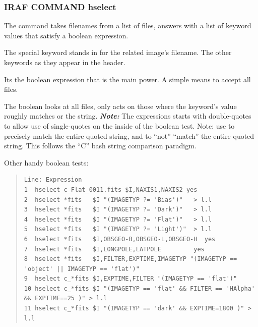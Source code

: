 \documentclass[letter,11pt,oneside]{article}
\begin{document}
\subsubsection{IRAF COMMAND hselect}

The {\color{verbcolor}{\verb#hselect#}} command takes filenames from
a list of files, answers with a list of keyword values that satisfy a
boolean expression.

\begin{quote}
{\color{verbcolor}{\verb#hselect filelist Comma-Keyword-List boolean#}}
\end{quote}

The special keyword {\color{verbcolor}{\verb#$I#}} stands in for the
related image's filename. The other keywords as they appear in the header.

Its the boolean expression that is the main power. A simple
{\color{verbcolor}{\verb#yes#}} means to accept all files.

The boolean {\color{verbcolor}{\verb#"(IMAGETYP ?= 'Bias')"#}} looks
at all files, only acts on those where the {\color{verbcolor}{\verb#IMAGETYP#}}
keyword's value roughly matches or {\color{verbcolor}{\verb#looks like (?=)#}}
the string. \textbf{\emph{Note:}} The expressions starts with double-quotes to allow
use of single-quotes on the inside of the boolean test. Note: use {\color{verbcolor}{\verb#==#}}
to precisely match the entire quoted string, and {\color{verbcolor}{\verb#!=#}} to
``not'' ``match'' the entire quoted string. This follows the ``C'' bash string comparison
paradigm.

Other handy boolean tests:

\begin{quote}
\begingroup \fontsize{10pt}{10pt}
\selectfont
\begin{verbatim}
Line: Expression
1  hselect c_Flat_0011.fits $I,NAXIS1,NAXIS2 yes
2  hselect *fits   $I "(IMAGETYP ?= 'Bias')"   > l.l
3  hselect *fits   $I "(IMAGETYP ?= 'Dark')"   > l.l
4  hselect *fits   $I "(IMAGETYP ?= 'Flat')"   > l.l
5  hselect *fits   $I "(IMAGETYP ?= 'Light')"  > l.l
6  hselect *fits   $I,OBSGEO-B,OBSGEO-L,OBSGEO-H  yes
7  hselect *fits   $I,LONGPOLE,LATPOLE         yes
8  hselect *fits   $I,FILTER,EXPTIME,IMAGETYP "(IMAGETYP == 'object' || IMAGETYP == 'flat')"
9  hselect c_*fits $I,EXPTIME,FILTER "(IMAGETYP == 'flat')"
10 hselect c_*fits $I "(IMAGETYP == 'flat' && FILTER == 'HAlpha' && EXPTIME==25 )" > l.l
11 hselect c_*fits $I "(IMAGETYP == 'dark' && EXPTIME=1800 )" > l.l
\end{verbatim}
\endgroup
\end{quote}
\end{document}
